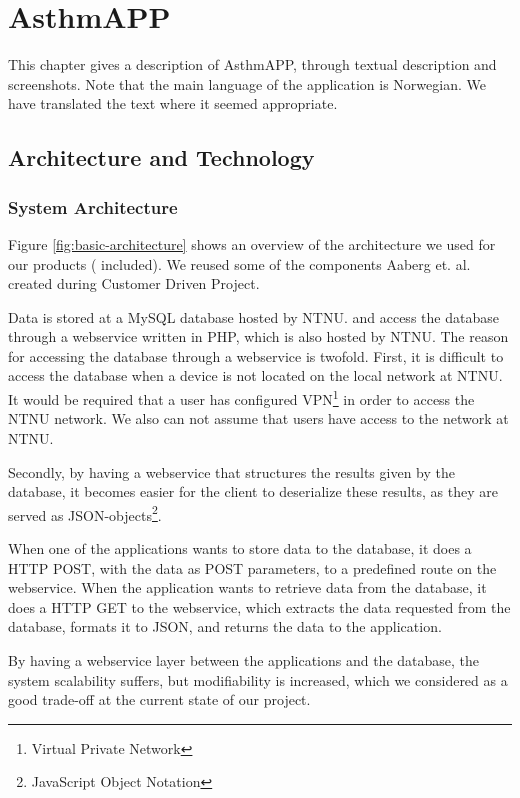\chapter{AsthmAPP}
\label{chp:description}

This chapter gives a description of AsthmAPP, through textual description and screenshots. Note that the main language of the application is Norwegian. We have translated the text where it seemed appropriate. 

\section{Architecture and Technology}

\subsection{System Architecture}
\label{sec:architecture}
Figure \ref{fig:basic-architecture} shows an overview of the architecture we used for our products (\ab{} included). We reused some of the components Aaberg et. al. created during Customer Driven Project\cite{CustomerDriven}. 

Data is stored at a MySQL database hosted by NTNU. \app{} and \ab{} access the database through a webservice written in PHP, which is also hosted by NTNU. The reason for accessing the database through a webservice is twofold. First, it is difficult to access the database when a device is not located on the local network at NTNU. It would be required that a user has configured VPN\footnote{Virtual Private Network} in order to access the NTNU network. We also can not assume that users have access to the network at NTNU.

Secondly, by having a webservice that structures the results given by the database, it becomes easier for the client to deserialize these results, as they are served as JSON-objects\footnote{JavaScript Object Notation}.    

When one of the applications wants to store data to the database, it does a HTTP POST, with the data as POST parameters, to a predefined route on the webservice. When the application wants to retrieve data from the database, it does a HTTP GET to the webservice, which extracts the data requested from the database, formats it to JSON, and returns the data to the application.  

By having a webservice layer between the applications and the database, the system scalability suffers, but modifiability is increased, which we considered as a good trade-off at the current state of our project. 

